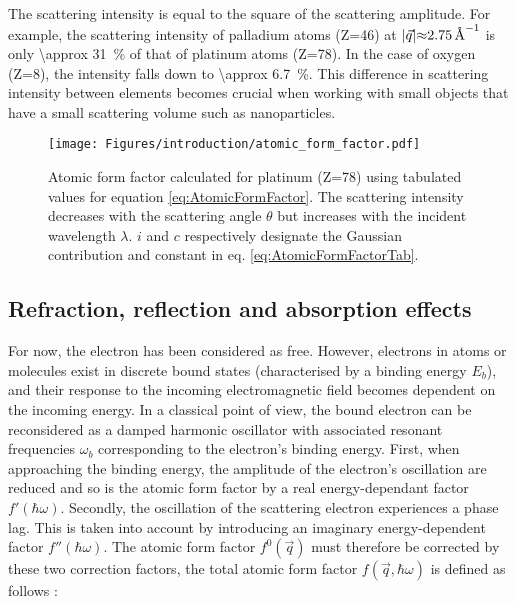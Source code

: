 The scattering intensity is equal to the square of the scattering amplitude.
For example, the scattering intensity of palladium atoms (Z=46) at $|\vec{q}| \qty{\approx 2.75}{\angstrom^{-1}}$ is only \qty{\approx 31}{\percent} of that of platinum atoms (Z=78).
In the case of oxygen (Z=8), the intensity falls down to \qty{\approx 6.7}{\percent}.
This difference in scattering intensity between elements becomes crucial when working with small objects that have a small scattering volume such as nanoparticles.

\begin{figure}[!htb]
    \centering
    \texttt{[image: Figures/introduction/atomic\_form\_factor.pdf]}
    \caption{
    Atomic form factor calculated for platinum (Z=78) using tabulated values \parencite{InterTablesOfCryst} for equation \ref{eq:AtomicFormFactor}. The scattering intensity decreases with the scattering angle $\theta$ but increases with the incident wavelength $\lambda$. $i$ and $c$ respectively designate the Gaussian contribution and constant in eq. \ref{eq:AtomicFormFactorTab}.
    }
    \label{fig:atomic_form_factor}
\end{figure}

\subsection{Refraction, reflection and absorption effects}\label{sec:RefractionReflectionAbsorption}

For now, the electron has been considered as free.
However, electrons in atoms or molecules exist in discrete bound states (characterised by a binding energy $E_b$), and their response to the incoming electromagnetic field becomes dependent on the incoming energy.
In a classical point of view, the bound electron can be reconsidered as a damped harmonic oscillator with associated resonant frequencies $\omega_b$ corresponding to the electron's binding energy.
First, when approaching the binding energy, the amplitude of the electron's oscillation are reduced and so is the atomic form factor by a real energy-dependant factor $f'(\hbar\omega)$.
Secondly, the oscillation of the scattering electron experiences a phase lag.
This is taken into account by introducing an imaginary energy-dependent factor $f''(\hbar\omega)$.
The atomic form factor $f^0(\vec{q})$ must therefore be corrected by these two correction factors, the total atomic form factor $f(\vec{q}, \hbar\omega)$ is defined as follows \parencite{NielsenMcMorrow}:


